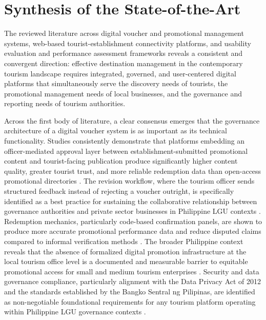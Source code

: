 \documentclass{research}
\begin{document}
\section{Synthesis of the State-of-the-Art}

The reviewed literature across digital voucher and promotional management
systems, web-based tourist-establishment connectivity platforms, and usability
evaluation and performance assessment frameworks reveals a consistent and
convergent direction: effective destination management in the contemporary
tourism landscape requires integrated, governed, and user-centered digital
platforms that simultaneously serve the discovery needs of tourists, the
promotional management needs of local businesses, and the governance and
reporting needs of tourism authorities.

Across the first body of literature, a clear consensus emerges that the
governance architecture of a digital voucher system is as important as its
technical functionality. Studies consistently demonstrate that platforms
embedding an officer-mediated approval layer between establishment-submitted
promotional content and tourist-facing publication produce significantly
higher content quality, greater tourist trust, and more reliable redemption
data than open-access promotional directories \cite{ahn2022, albu2025,
elarchi2023}. The revision workflow, where the tourism officer sends
structured feedback instead of rejecting a voucher outright, is
specifically identified as a best practice for sustaining the collaborative
relationship between governance authorities and private sector businesses
in Philippine LGU contexts \cite{cabrera2024, nunez2022}. Redemption
mechanics, particularly code-based confirmation panels, are shown to
produce more accurate promotional performance data and reduce disputed
claims compared to informal verification methods \cite{zhang2022,
park2022}. The broader Philippine context reveals that the absence of
formalized digital promotion infrastructure at the local tourism office
level is a documented and measurable barrier to equitable promotional
access for small and medium tourism enterprises \cite{cruz2024, nunez2022,
buena2022, evangelista2022}. Security and data governance compliance,
particularly alignment with the Data Privacy Act of 2012 and the
standards established by the Bangko Sentral ng Pilipinas, are
identified as non-negotiable foundational requirements for any tourism
platform operating within Philippine LGU governance contexts
\cite{bsp2024, psa2025, kerpedzhiev2021, carlisle2021}.
\end{document}
